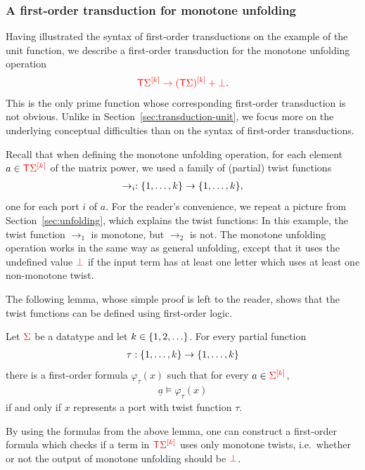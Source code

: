 \subsubsection{A first-order transduction for monotone unfolding}
\label{sec:fo-transduction-for-unfolding}
Having illustrated the syntax of first-order transductions on the example of the unit function, we describe a first-order transduction for the monotone unfolding operation 
\begin{align*}
    \ranked{\tmonad \mati k{\Sigma} \to \mati k{( \tmonad \Sigma)} + \termset}.
\end{align*}
This is the only prime function whose corresponding first-order transduction is not obvious.
Unlike in Section~\ref{sec:transduction-unit},  we focus more  on the underlying conceptual difficulties than on the syntax of first-order transductions. 

Recall  that when  defining the  monotone  unfolding operation,  for each element $a \in \ranked{\tmonad \mati k{\Sigma}}$ of the matrix power, we used a family of (partial) twist functions
\begin{align*}
\to_i : \set{1,\ldots,k} \to \set{1,\ldots,k},
\end{align*}
one for each port $i$ of $a$. For the reader's convenience, we repeat a picture from Section~\ref{sec:unfolding}, which explains the twist functions:
In this example, the twist function $\to_1$ is monotone, but  $\to_2$ is not. The monotone unfolding operation works in the same way as general  unfolding, except that it uses the undefined value $\termset$ if the input term has at least one letter which uses at least one non-monotone twist. 

The following lemma, whose simple proof is left to the reader, shows that the twist functions can be defined using first-order logic.
\begin{lemma}
    Let $\rSigma$ be a datatype and let $k \in \set{1,2,\ldots}$. For every partial function
    \begin{align*}
    \tau : \set{1,\ldots,k} \to \set{1,\ldots,k}
    \end{align*}
    there is a first-order formula $\varphi_\tau(x)$ such that for every $a \in \mati k \rSigma$, 
    \begin{align*}
    \underline a \models \varphi_\tau(x)
    \end{align*}
     if and only if $x$ represents a port  with twist function $\tau$.  
\end{lemma}
By using the formulas from the above lemma, one can construct  a first-order formula which checks if a term in $\tmonad \mati k \rSigma$ uses only monotone twists, i.e.~whether or not the output of monotone unfolding should be $\termset$. 

